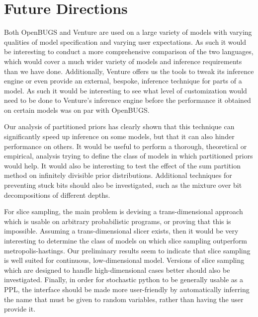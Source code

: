 \section{Future Directions}
Both OpenBUGS and Venture are used on a large variety of models with varying qualities of model specification and varying user expectations. As such it would be interesting to conduct a more comprehensive comparison of the two languages, which would cover a much wider variety of models and inference requirements than we have done. Additionally, Venture offers us the tools to tweak its inference engine or even provide an external, bespoke, inference technique for parts of a model. As such it would be interesting to see what level of customization would need to be done to Venture's inference engine before the performance it obtained on certain models was on par with OpenBUGS.

Our analysis of partitioned priors has clearly shown that this technique can significantly speed up inference on some models, but that it can also hinder performance on others. It would be useful to perform a thorough, theoretical or empirical, analysis trying to define the class of models in which partitioned priors would help. It would also be interesting to test the effect of the sum partition method on infinitely divisible prior distributions. Additional techniques for preventing stuck bits should also be investigated, such as the mixture over bit decompositions of different depths. 

For slice sampling, the main problem is devising a trans-dimensional approach which is usable on arbitrary probabilistic programs, or proving that this is impossible. Assuming a trans-dimensional slicer exists, then it would be very interesting to determine the class of models on which slice sampling outperform metropolis-hastings. Our preliminary results seem to indicate that slice sampling is well suited for continuous, low-dimensional model. Versions of slice sampling which are designed to handle high-dimensional cases better should also be investigated. Finally, in order for stochastic python to be generally usable as a PPL, the interface should be made more user-friendly by automatically inferring the name that must be given to random variables, rather than having the user provide it.


